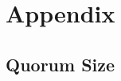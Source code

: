 \documentclass[USenglish,oneside,twocolumn]{article}
\begin{document}
%
%

 


\section{Appendix}


\subsection{Quorum Size} %
\label{sec:qSize}
\end{document}
